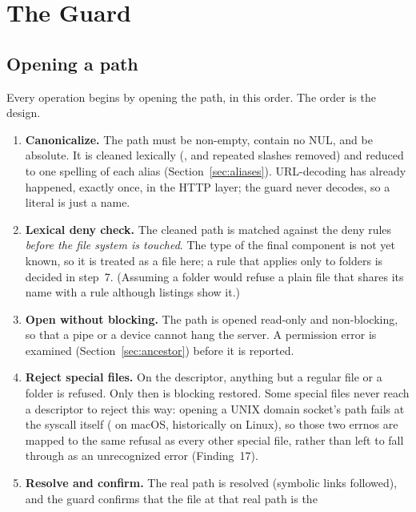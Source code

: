 \section{The Guard}
\label{sec:guard}

\subsection{Opening a path}

Every operation begins by opening the path, in this order.  The order is the design.

\begin{enumerate}
  \item \textbf{Canonicalize.}  The path must be non-empty, contain no NUL, and be
        absolute.  It is cleaned lexically (,  and repeated slashes
        removed) and reduced to one spelling of each alias (Section~\ref{sec:aliases}).
        URL-decoding has already happened, exactly once, in the HTTP layer; the guard
        never decodes, so a literal  is just a name.
  \item \textbf{Lexical deny check.}  The cleaned path is matched against the deny
        rules \emph{before the file system is touched}.  The type of the final
        component is not yet known, so it is treated as a file here; a rule that
        applies only to folders is decided in step~7.  (Assuming a folder would refuse
        a plain file that shares its name with a  rule although listings
        show it.)
  \item \textbf{Open without blocking.}  The path is opened read-only and
        non-blocking, so that a pipe or a device cannot hang the server.  A permission
        error is examined (Section~\ref{sec:ancestor}) before it is reported.
  \item \textbf{Reject special files.}  On the descriptor, anything but a regular file
        or a folder is refused.  Only then is blocking restored.  Some special files
        never reach a descriptor to reject this way: opening a UNIX domain socket's
        path fails at the syscall itself ( on macOS, historically
         on Linux), so those two errnos are mapped to the same refusal as
        every other special file, rather than left to fall through as an unrecognized
        error (Finding~17).
  \item \textbf{Resolve and confirm.}  The real path is resolved (symbolic links
        followed), and the guard confirms that the file at that real path is the

\end{enumerate}
